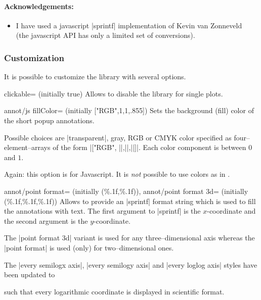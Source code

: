 	\paragraph{Acknowledgements:}
	\begin{itemize}
		\item I have used a javascript |sprintf| implementation of Kevin van Zonneveld~\cite{phptojs} (the javascript API has only a limited set of conversions).
	\end{itemize}


\subsubsection{Customization}
It is possible to customize the library with several options.

\begin{pgfplotskey}{clickable= (initially true)}
	Allows to disable the library for single plots.
\end{pgfplotskey}

\begin{pgfplotskey}{annot/js fillColor= (initially ["RGB",1,1,.855])}
	Sets the background (fill) color of the short popup annotations. 
	
	Possible choices are |transparent|, gray, RGB or CMYK color specified as four--element--arrays of the form
	|["RGB", ||,||,||]|. Each color component is between $0$ and $1$.

	Again: this option is for Javascript. It is \emph{not} possible to use colors as in \pgfname.
\end{pgfplotskey}

\begin{pgfplotskeylist}{%
	annot/point format= (initially {(\%.1f,\%.1f)}),
	annot/point format 3d= (initially {(\%.1f,\%.1f,\%.1f)})}
	Allows to provide an |sprintf| format string which is used to fill the annotations with text. 
	The first argument to |sprintf| is the $x$-coordinate and the second argument is the $y$-coordinate.

	The |point format 3d| variant is used for any three--dimensional axis whereas the |point format| is used (only) for two--dimensional ones.

	The |every semilogx axis|, |every semilogy axis| and |every loglog axis| styles have been updated to
\begin{codeexample}
\end{codeexample}
	\noindent such that every logarithmic coordinate is displayed in scientific format.
\end{pgfplotskeylist}


